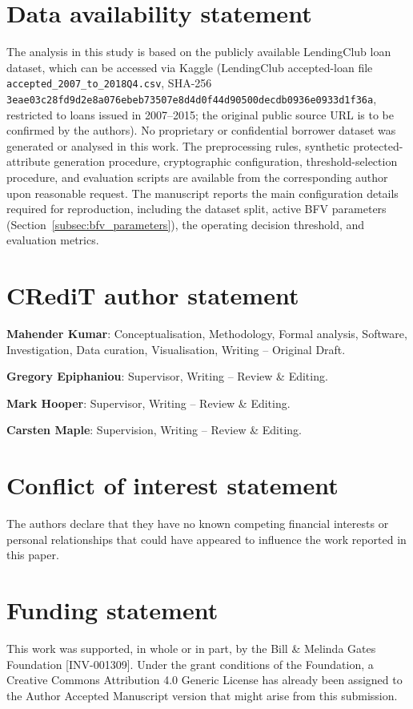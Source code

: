 \documentclass[a4paper,fleqn]{cas-dc}
\begin{document}
\color{black}



\section*{Data availability statement}
The analysis in this study is based on the publicly available LendingClub loan dataset, which can be accessed via Kaggle (LendingClub accepted-loan file \texttt{accepted\_2007\_to\_2018Q4.csv}, SHA-256 \texttt{3eae03c28fd9d2e8a076ebeb73507e8d4d0f44d90500decdb0936e0933d1f36a}, restricted to loans issued in 2007--2015; the original public source URL is to be confirmed by the authors). No proprietary or confidential borrower dataset was generated or analysed in this work. The preprocessing rules, synthetic protected-attribute generation procedure, cryptographic configuration, threshold-selection procedure, and evaluation scripts are available from the corresponding author upon reasonable request. The manuscript reports the main configuration details required for reproduction, including the dataset split, active BFV parameters (Section~\ref{subsec:bfv_parameters}), the operating decision threshold, and evaluation metrics.

\section*{CRediT author statement}
\textbf{Mahender Kumar}: Conceptualisation, Methodology, Formal analysis, Software, Investigation, Data curation, Visualisation, Writing – Original Draft.

\textbf{Gregory Epiphaniou}: Supervisor, Writing – Review \& Editing.

\textbf{Mark Hooper}: Supervisor, Writing – Review \& Editing.

\textbf{Carsten Maple}: Supervision, Writing – Review \& Editing.

\section*{Conflict of interest statement}
The authors declare that they have no known competing financial interests or personal relationships that could have appeared to influence the work reported in this paper.

\section*{Funding statement}
This work was supported, in whole or in part, by the Bill \& Melinda Gates Foundation [INV-001309]. Under the grant conditions of the Foundation, a Creative Commons Attribution 4.0 Generic License has already been assigned to the Author Accepted Manuscript version that might arise from this submission.
\end{document}
